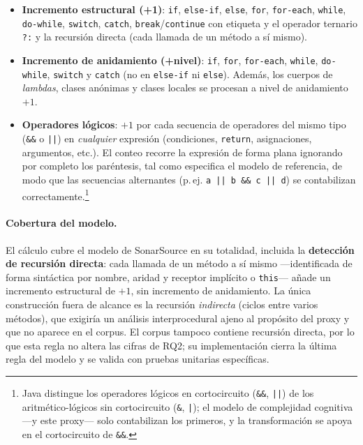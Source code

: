 \begin{itemize}
  \item \textbf{Incremento estructural (+1)}: \lstinline|if|,
  \lstinline|else-if|, \lstinline|else|, \lstinline|for|, \lstinline|for-each|,
  \lstinline|while|, \lstinline|do-while|, \lstinline|switch|,
  \lstinline|catch|, \lstinline|break|/\lstinline|continue| con etiqueta y
  el operador ternario \lstinline|?:| y la recursión directa (cada llamada de
  un método a sí mismo).
  \item \textbf{Incremento de anidamiento (+nivel)}: \lstinline|if|,
  \lstinline|for|, \lstinline|for-each|, \lstinline|while|, \lstinline|do-while|,
  \lstinline|switch| y \lstinline|catch| (no en \lstinline|else-if| ni
  \lstinline|else|). Además, los cuerpos de \emph{lambdas}, clases anónimas
  y clases locales se procesan a nivel de anidamiento $+1$.
  \item \textbf{Operadores lógicos}: $+1$ por cada secuencia de operadores
  del mismo tipo (\lstinline|&&| o \lstinline=||=) en \emph{cualquier}
  expresión (condiciones, \lstinline|return|, asignaciones, argumentos,
  etc.). El conteo recorre la expresión de forma plana ignorando por
  completo los paréntesis, tal como especifica el modelo de referencia, de
  modo que las secuencias alternantes (p.\,ej. \lstinline=a || b && c || d=)
  se contabilizan correctamente.\footnote{Java distingue los operadores lógicos
  en cortocircuito (\lstinline|&&|, \lstinline=||=) de los aritmético-lógicos
  sin cortocircuito (\lstinline|&|, \lstinline=|=); el modelo de complejidad
  cognitiva —y este proxy— solo contabilizan los primeros, y la transformación
  se apoya en el cortocircuito de \lstinline|&&|.}
\end{itemize}

\paragraph{Cobertura del modelo.}
El cálculo cubre el modelo de SonarSource en su totalidad, incluida la
\textbf{detección de recursión directa}: cada llamada de un método a sí mismo
---identificada de forma sintáctica por nombre, aridad y receptor implícito o
\texttt{this}--- añade un incremento estructural de $+1$, sin incremento de
anidamiento. La única construcción fuera de alcance es la recursión
\emph{indirecta} (ciclos entre varios métodos), que exigiría un análisis
interprocedural ajeno al propósito del proxy y que no aparece en el corpus. El
corpus tampoco contiene recursión directa, por lo que esta regla no altera las
cifras de RQ2; su implementación cierra la última regla del modelo y se valida
con pruebas unitarias específicas.

